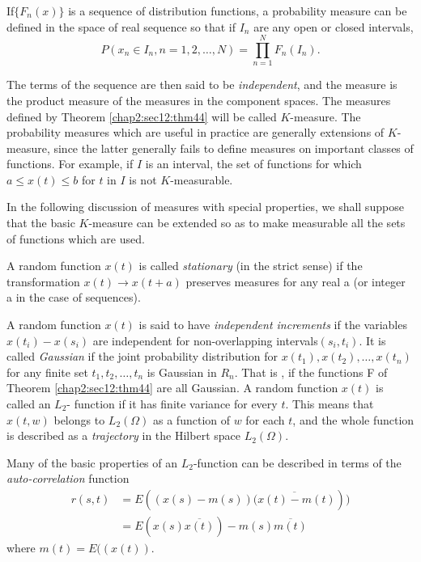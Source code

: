 \begin{coro*}
  If\pageoriginale $\big\{ F_n(x)\big\}$ is a sequence of distribution functions, a
  probability measure can be defined in the space of real sequence so
  that if $I_n$ are any open or closed intervals, 
  $$ 
  P(x_{n} \in I_{n}, n=1, 2, \ldots , N)=
  \prod_{n=1}^{N} F_{n}(I_{n}).
  $$
\end{coro*}

  The terms of the sequence are then said to be \textit{independent}, and the
  measure is the product measure of the measures in the component
  spaces. The measures defined by Theorem \ref{chap2:sec12:thm44} will be called
  $K$-measure. The probability measures which are useful in practice are
  generally extensions of $K$-measure, since the latter generally fails to
  define measures on important classes of functions. For example, if $I$ is
  an interval, the set of functions for which  $a \leq x(t)\leq b$
  for $t$ in $I$ is not $K$-measurable. 
  
  In the following discussion of measures with special properties, we
  shall suppose that the basic $K$-measure can be extended so as to make
  measurable all the sets of functions which are used. 
  
  A random function $x(t)$ is called \textit{stationary} (in the
  strict sense) if 
  the transformation $x(t) \rightarrow x(t + a)$ preserves measures for
  any real a (or integer a in the case of sequences). 
  
  A random function $x(t)$ is said to have \textit{independent
    increments} if the 
  variables $x(t_i) - x(s_i)$ are independent for non-overlapping 
  intervals\pageoriginale $(s_i , t_i)$. It is called \textit{Gaussian} if the joint
  probability distribution for $x(t_1) , x(t_2), \ldots , x(t_n)$ for
  any finite set $t_1, t_2 , \ldots , t_n$ is Gaussian in $R_n$. That is
  , if the functions F of Theorem \ref{chap2:sec12:thm44} are all Gaussian. A random function
  $x(t)$ is called an $L_2$- function if it has finite variance for every
  $t$. This means that $x(t, w)$ belongs to $L_2(\Omega)$ as a function of
  $w$ for each $t$, and the whole function is described as a
  \textit{trajectory} in 
  the Hilbert space $L_2 (\Omega)$. 
  
  Many of the basic properties of an $L_2$-function can be described in
  terms of the \textit{auto-correlation} function  
  \begin{align*}
    r(s, t) &  =E ((x(s) - m (s)) \overline{(x(t) - m (t) }))\\
    &= E (x(s) \overline{x(t)}) - m(s) \overline{m(t)}
  \end{align*}
  where $m(t) = E ((x(t))$.
  
